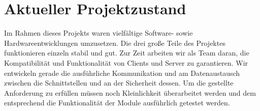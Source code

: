 
\chapter{Aktueller Projektzustand}
Im Rahmen dieses Projekts waren vielfältige Software- sowie Hardwareentwicklungen umzusetzen. Die drei große Teile des Projektes funktionieren einzeln stabil und gut. Zur Zeit arbeiten wir als Team daran, die Kompatibilität und Funktionalität von Clients und Server zu garantieren. Wir entwickeln gerade die ausführliche Kommunikation und am Datenaustausch zwischen die Schnittstellen und an der Sicherheit dessen. Um die gestellte Anforderung zu erfüllen müssen noch Kleinlichkeit überarbeitet werden und dem entsprechend die Funktionalität der Module ausführlich getestet werden.